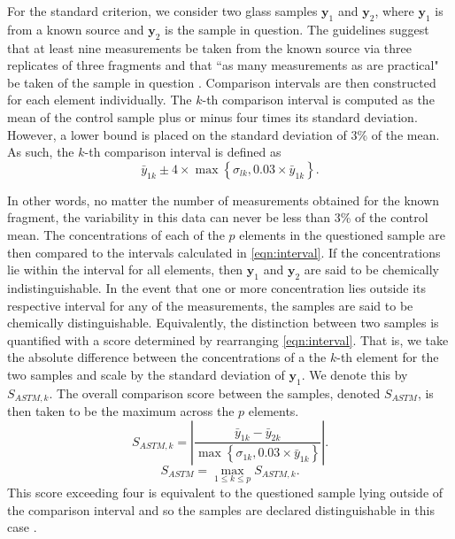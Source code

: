 \documentclass[a4paper]{article}
\newcommand{\bs}[1]{\boldsymbol{#1}}
\begin{document}
For the standard criterion, we consider two glass samples $\bs{y}_{1}$ and $\bs{y}_{2}$, where $\bs{y}_{1}$ is from a known source and $\bs{y}_{2}$ is the sample in question. The guidelines suggest that at least nine measurements be taken from the known source via three replicates of three fragments and that ``as many measurements as are practical" be taken of the sample in question \citep{ASTM16}. Comparison intervals are then constructed for each element individually. The $k$-th comparison interval is computed as the mean of the control sample plus or minus four times its standard deviation. However, a lower bound is placed on the standard deviation of 3\% of the mean. As such, the $k$-th comparison interval is defined as
\begin{equation}
\label{eqn:interval}
\bar{y}_{1k} \pm 4 \times \max\left\{ \sigma_{lk}, 0.03 \times  \bar{y}_{1k}\right\}.
\end{equation}

In other words, no matter the number of measurements obtained for the known fragment, the variability in this data can never be less than 3\% of the control mean. The concentrations of each of the $p$ elements in the questioned sample are then compared to the intervals calculated in \autoref{eqn:interval}. If the concentrations lie within the interval for all elements, then $\bs{y}_{1}$ and $\bs{y}_{2}$ are said to be chemically indistinguishable. In the event that one or more concentration lies outside its respective interval for any of the measurements, the samples are said to be chemically distinguishable. Equivalently, the distinction between two samples is quantified with a score determined by rearranging \cref{eqn:interval}. That is, we take the absolute difference between the concentrations of a the $k$-th element for the two samples and scale by the standard deviation of $\bs{y}_{1}$. We denote this by $S_{ASTM,k}$. The overall comparison score between the samples, denoted $S_{ASTM}$, is then taken to be the maximum across the $p$ elements.
\begin{equation}
\label{eqn:score}
S_{ASTM,k} = \left| \frac{\bar{y}_{1k} - \bar{y}_{2k}}{\max\left\{ \sigma_{1k}, 0.03 \times  \bar{y}_{1k}\right\}} \right|.
\end{equation}
\begin{equation*}
    S_{ASTM} = \max_{1 \leq k \leq p} S_{ASTM,k}.
\end{equation*}
This score exceeding four is equivalent to the questioned sample lying outside of the comparison interval and so the samples are declared distinguishable in this case \citep{ASTM12,ASTM16}.
\end{document}
